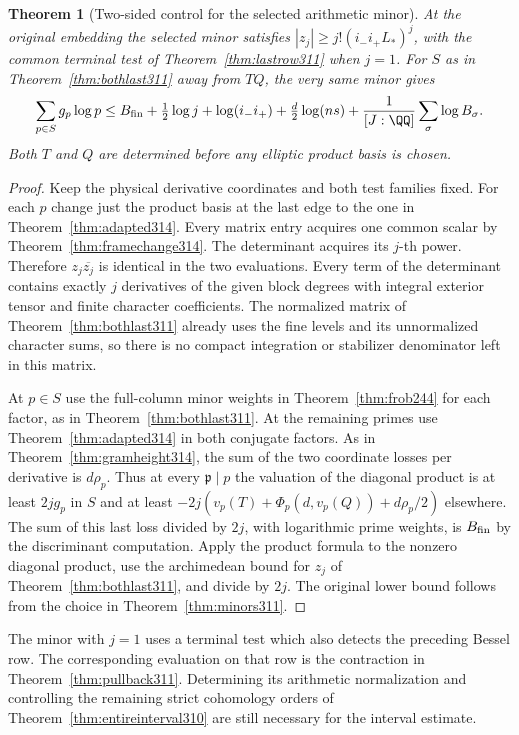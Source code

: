 \documentclass[a4paper,11pt]{article}
\newtheorem{theorem}[proposition]{Theorem}
\theoremstyle{definition}
\theoremstyle{remark}
\numberwithin{equation}{section}
\begin{document}
\begin{theorem}[Two-sided control for the selected arithmetic minor]\leavevmode
\label{thm:terminalheight314}
At the original embedding the selected minor satisfies
\(|z_j|\ge j!(i_-i_+L_*)^j\), with the common terminal test of
Theorem~\ref{thm:lastrow311} when \(j=1\). For \(S\) as in
Theorem~\ref{thm:bothlast311} away from \(TQ\), the very same
minor gives
\[
 \sum_{p\in S}g_p\log p\le B_{\rm fin}+
       \tfrac12\log j+\log(i_-i_+)+\tfrac d2\log(ns)
                     +\frac1{[J:\QQ]}\sum_\sigma\log B_\sigma .
\]
Both \(T\) and \(Q\) are determined before any elliptic product
basis is chosen.
\end{theorem}
\begin{proof}
Keep the physical derivative coordinates and both test families
fixed. For each \(p\) change just the product basis at the last
edge to the one in Theorem~\ref{thm:adapted314}. Every matrix
entry acquires one common scalar by
Theorem~\ref{thm:framechange314}. The determinant acquires its
\(j\)-th power. Therefore \(z_j\overline{z_j}\) is identical
in the two evaluations. Every term of the determinant contains
exactly \(j\) derivatives of the given block degrees with integral
exterior tensor and finite character coefficients. The normalized
matrix of Theorem~\ref{thm:bothlast311} already uses the fine
levels and its unnormalized character sums, so there is no
compact integration or stabilizer denominator left in this
matrix.

At \(p\in S\) use the full-column minor weights in
Theorem~\ref{thm:frob244} for each factor, as in
Theorem~\ref{thm:bothlast311}. At the remaining primes use
Theorem~\ref{thm:adapted314} in both conjugate factors.
As in Theorem~\ref{thm:gramheight314}, the sum of the two
coordinate losses per derivative is \(d\rho_p\). Thus at
every \(\mathfrak p\mid p\) the valuation of the diagonal
product is at least \(2jg_p\) in \(S\) and at least
\(-2j(v_p(T)+\Phi_p(d,v_p(Q))+d\rho_p/2)\) elsewhere.
The sum of this last loss divided by \(2j\), with logarithmic
prime weights, is \(B_{\rm fin}\) by the discriminant computation.
Apply the product formula to the nonzero diagonal product, use
the archimedean bound for \(z_j\) of
Theorem~\ref{thm:bothlast311}, and divide by \(2j\). The original
lower bound follows from the choice in Theorem~\ref{thm:minors311}.
\end{proof}

The minor with \(j=1\) uses a terminal test which also detects
the preceding Bessel row. The corresponding evaluation on that
row is the contraction in Theorem~\ref{thm:pullback311}.
Determining its arithmetic normalization and controlling the
remaining strict cohomology orders of
Theorem~\ref{thm:entireinterval310} are still necessary for the
interval estimate.
\end{document}
